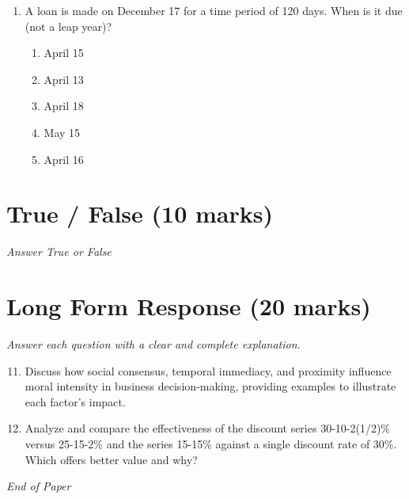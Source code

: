 \documentclass[12pt]{article}
\begin{document}
\begin{enumerate}[label=\arabic*.]
\begin{enumerate}[label=(\alph*)]
    \item Ecological, equitable, and economic
    \item Equitable, evolutionary, and emerging
    \item Evolutionary, equitable, and economic.
\end{enumerate}
\item A loan is made on December 17 for a time period of 120 days. When is it due (not a leap year)?
\begin{enumerate}[label=(\alph*)]
    \item April 15
    \item April 13
    \item April 18
    \item May 15
    \item April 16
\end{enumerate}
\end{enumerate}

\section*{True / False (10 marks)}
\textit{Answer True or False}

\section*{Long Form Response (20 marks)}
\textit{Answer each question with a clear and complete explanation.}
\begin{enumerate}[label=\arabic*.]
\setcounter{enumi}{10}
\item Discuss how social consensus, temporal immediacy, and proximity influence moral intensity in business decision-making, providing examples to illustrate each factor's impact.
\item Analyze and compare the effectiveness of the discount series 30-10-2(1/2)\% versus 25-15-2\% and the series 15-15\% against a single discount rate of 30\%. Which offers better value and why?
\end{enumerate}

\vfill
\noindent\textit{End of Paper}
\end{document}
